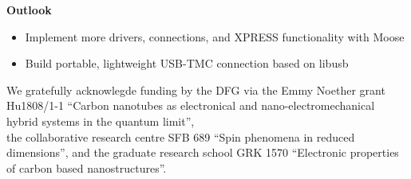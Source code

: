 \documentclass[portrait]{a0poster}
\newcommand{\lightblue}{\color{lightblue}}
\newcommand{\heading}[1]{
  {\color{heading}\boldmath\textbf{\huge #1}}\\[\medskipamount]
}
\begin{document}
{\begin{minipage}[t][\columnheighta-2\fboxsep-2\fboxrule][t]
\begin{minipage}{\textwidth}
\begin{itemize}
\end{itemize}

\vspace*{2cm}
\heading{Outlook}
\vspace*{-2cm}

\begin{itemize}
\item Implement more drivers, connections, and XPRESS functionality with
  Moose
\item Build portable, lightweight USB-TMC connection based on libusb
\end{itemize}


\end{minipage}

\end{minipage}}  %
%
%
%

\vspace*{0.5cm}
\begin{center}\color{invheading}\large
\hspace*{-4cm}We gratefully acknowlegde funding by the DFG via the Emmy Noether grant
Hu1808/1-1 ``Carbon nanotubes as electronical and nano-electromechanical hybrid systems in
the quantum limit'',
\\ \hspace*{-4cm}
the collaborative research centre SFB 689 ``Spin phenomena in reduced dimensions'', and
the graduate research school GRK 1570  ``Electronic properties of
carbon based nanostructures''.
\end{center}
\end{document}
